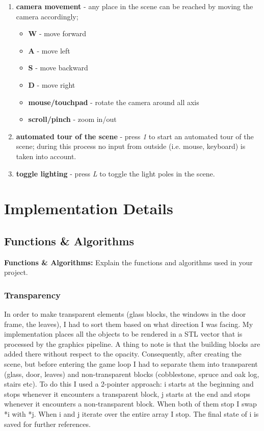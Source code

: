 \documentclass[12pt]{article}
\begin{document}
	\begin{enumerate}

		\item \textbf{camera movement} - any place in the scene can be reached by moving the camera accordingly; 

		\begin{itemize}
			\item \textbf{W} - move forward
			\item \textbf{A} - move left
			\item \textbf{S} - move backward
			\item \textbf{D} - move right
			\item \textbf{mouse/touchpad} - rotate the camera around all axis
			\item \textbf{scroll/pinch} - zoom in/out
		\end{itemize}

		\item \textbf{automated tour of the scene} - press \textit{1} to start an automated tour of the scene; during this process no input from outside (i.e. mouse, keyboard) is taken into account.		

		\item \textbf{toggle lighting} - press \textit{L} to toggle the light poles in the scene.
		
	\end{enumerate}
	
	\section{Implementation Details}
	
	\subsection{Functions \& Algorithms}
	
	\textbf{Functions \& Algorithms:} Explain the functions and algorithms used in your project.
	
	\subsubsection{Transparency}
	
	In order to make transparent elements (glass blocks, the windows in the door frame, the leaves), I had to sort them based on what direction I was facing. My implementation places all the objects to be rendered in a STL vector that is processed by the graphics pipeline. A thing to note is that the building blocks are added there without respect to the opacity. Consequently, after creating the scene, but before entering the game loop I had to separate them into transparent (glass, door, leaves) and non-transparent blocks (cobblestone, spruce and oak log, stairs etc). To do this I used a 2-pointer approach: i starts at the beginning and stops whenever it encounters a transparent block, j starts at the end and stops whenever it encounters a non-transparent block. When both of them stop I swap *i with *j. When i and j iterate over the entire array I stop. The final state of i is saved for further references.
		
\end{document}
